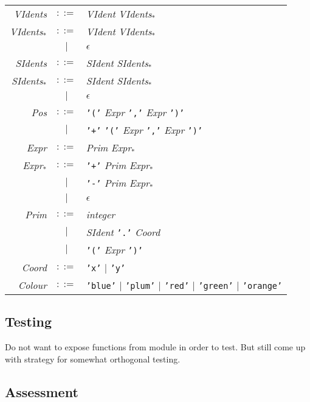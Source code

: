 \documentclass[
paper=a4,
oneside,
fontsize=11pt,
numbers=noenddot,
headinclude=false, %
footinclude=false, %
fleqn,             %
DIV=8
]{scrartcl}
\begin{document}
\begin{table}[h]
\begin{tabularx}{\textwidth}{rcX}
    {\em VIdents}    & $::=$ & {\em VIdent} {\em VIdents$_{*}$}\\
    {\em VIdents$_{*}$}    & $::=$ & {\em VIdent} {\em VIdents$_{*}$}\\
               & $|$   & $\epsilon$\\
    {\em SIdents}    & $::=$ & {\em SIdent} {\em SIdents$_{*}$}\\
    {\em SIdents$_{*}$}    & $::=$ & {\em SIdent} {\em SIdents$_{*}$}\\
               & $|$   & $\epsilon$\\
    {\em Pos}        & $::=$ & {\tt '('} {\em Expr} {\tt ','} {\em Expr} {\tt ')'}\\
               & $|$   & {\tt '+'} {\tt '('} {\em Expr} {\tt ','} {\em Expr} {\tt ')'}\\
    {\em Expr}       & $::=$ & {\em Prim} {\em Expr$_{*}$}\\
    {\em Expr$_{*}$}       & $::=$ & {\tt '+'} {\em Prim} {\em Expr$_{*}$}\\
               & $|$   & {\tt '-'} {\em Prim} {\em Expr$_{*}$}\\
               & $|$   & $\epsilon$\\
    {\em Prim}       & $::=$ & {\em integer}\\
               & $|$   & {\em SIdent} {\tt '.'} {\em Coord}\\
               & $|$   & {\tt '('} {\em Expr} {\tt ')'}\\
    {\em Coord}       & $::=$ & {\tt 'x'} $|$ {\tt 'y'}\\
    {\em Colour}     & $::=$ & {\tt 'blue'} $|$ {\tt 'plum'} $|$ {\tt 'red'} $|$ {\tt 'green'} $|$ {\tt 'orange'}\\
    \bottomrule
  \end{tabularx}
\end{table}

\subsection{Testing}
\label{sec:testing}

Do not want to expose functions from module in order to test. But still come up
with strategy for somewhat orthogonal testing.

\subsection{Assessment}
\label{sec:assessment}
\end{document}

